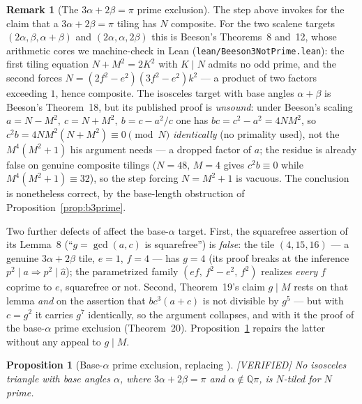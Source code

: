 \documentclass[11pt,reqno]{amsart}
\theoremstyle{plain}
\newtheorem{proposition}[theorem]{Proposition}
\theoremstyle{definition}
\newtheorem{remark}[theorem]{Remark}
\newcommand{\Q}{\mathbb{Q}}
\newcommand{\lab}[1]{\hfill\textnormal{\footnotesize\textsc{[#1]}}}
\begin{document}
\begin{remark}[The $3\alpha+2\beta=\pi$ prime exclusion]\label{rem:b3prime}
The step above invokes \cite{BeesonIII} for the claim that a $3\alpha+2\beta=\pi$ tiling has $N$
composite. For the two scalene targets $(2\alpha,\beta,\alpha{+}\beta)$ and $(2\alpha,\alpha,2\beta)$
this is Beeson's Theorems~8 and~12, whose arithmetic cores we machine-check in Lean
(\texttt{lean/Beeson3NotPrime.lean}): the first tiling equation $N+M^2=2K^2$ with $K\mid N$ admits no
odd prime, and the second forces $N=(2f^2-e^2)(3f^2-e^2)k^2$ --- a product of two factors exceeding
$1$, hence composite. The isosceles target with base angles $\alpha{+}\beta$ is
Beeson's Theorem~18, but its published proof is \emph{unsound}: under Beeson's scaling
$a=N-M^2,\ c=N+M^2,\ b=c-a^2/c$ one has $bc=c^2-a^2=4NM^2$, so $c^2b=4NM^2(N+M^2)\equiv0\pmod N$
\emph{identically} (no primality used), not the $M^4(M^2+1)$ his argument needs --- a dropped factor
of $a$; the residue is already false on genuine composite tilings ($N=48,\,M=4$ gives $c^2b\equiv0$
while $M^4(M^2+1)\equiv32$), so the step forcing $N=M^2+1$ is vacuous. The conclusion is nonetheless
correct, by the base-length obstruction of Proposition~\ref{prop:b3prime}.

Two further defects of \cite{BeesonIII} affect the base-$\alpha$ target. First, the squarefree
assertion of its Lemma~8 (``$g=\gcd(a,c)$ is squarefree'') is \emph{false}: the tile $(4,15,16)$
--- a genuine $3\alpha+2\beta$ tile, $e=1$, $f=4$ --- has $g=4$ (its proof breaks at the inference
$p^2\mid a\Rightarrow p^2\mid\hat a$); the parametrized family $(ef,\,f^2-e^2,\,f^2)$ realizes
\emph{every} $f$ coprime to $e$, squarefree or not. Second, Theorem~19's claim $g\mid M$ rests on
that lemma \emph{and} on the assertion that $bc^3(a+c)$ is not divisible by $g^5$ --- but with
$c=g^2$ it carries $g^7$ identically, so the argument collapses, and with it the proof of the
base-$\alpha$ prime exclusion (Theorem~20). Proposition~\ref{prop:isoalphaprime} repairs the
latter without any appeal to $g\mid M$.
\end{remark}

\begin{proposition}[Base-$\alpha$ prime exclusion, replacing {\cite[Thm.~20]{BeesonIII}}]\label{prop:isoalphaprime}\lab{VERIFIED}
No isosceles triangle with base angles $\alpha$, where $3\alpha+2\beta=\pi$ and
$\alpha\notin\Q\pi$, is $N$-tiled for $N$ prime.
\end{proposition}
\end{document}
